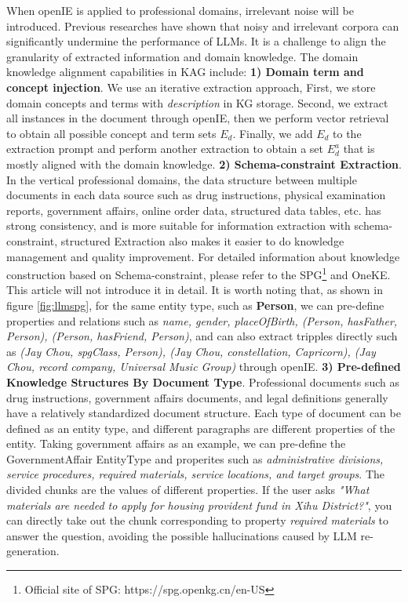 \documentclass{article}
\begin{document}
When openIE is applied to professional domains, irrelevant noise will be introduced. Previous researches\cite{chen2024benchmarking,yu2023chain,wu2024easily} have shown that noisy and irrelevant corpora can significantly undermine the performance of LLMs. It is a challenge to align the granularity of extracted information and domain knowledge. The domain knowledge alignment capabilities in KAG include: \textbf{1) Domain term and concept injection}. We use an iterative extraction approach, First, we store domain concepts and terms with \textit{description} in KG storage. Second, we extract all instances in the document through openIE, then we perform vector retrieval to obtain all possible concept and term sets $E_d$. Finally, we add $E_d$ to the extraction prompt and perform another extraction to obtain a set $E_{d}^{a}$ that is mostly aligned with the domain knowledge. \textbf{2) Schema-constraint Extraction}. In the vertical professional domains, the data structure between multiple documents in each data source such as drug instructions, physical examination reports, government affairs, online order data, structured data tables, etc. has strong consistency, and is more suitable for information extraction with schema-constraint, structured Extraction also makes it easier to do knowledge management and quality improvement. For detailed information about knowledge construction based on Schema-constraint, please refer to the SPG\footnote{Official site of SPG: https://spg.openkg.cn/en-US} and OneKE\cite{gui2024iepile}. This article will not introduce it in detail. It is worth noting that, as shown in figure \ref{fig:llmspg}, for the same entity type, such as \textbf{Person}, we can pre-define properties and relations such as \textit{{name, gender, placeOfBirth, (Person, hasFather, Person), (Person, hasFriend, Person)}}, and can also extract tripples directly such as \textit{(Jay Chou, spgClass, Person), (Jay Chou, constellation, Capricorn), (Jay Chou, record company, Universal Music Group)} through openIE. \textbf{3) Pre-defined Knowledge Structures By Document Type}. Professional documents such as drug instructions, government affairs documents, and legal definitions generally have a relatively standardized document structure. Each type of document can be defined as an entity type, and different paragraphs are different properties of the entity. Taking government affairs as an example, we can pre-define the GovernmentAffair EntityType and properites such as \textit{administrative divisions, service procedures, required materials, service locations, and target groups}. The divided chunks are the values of different properties. If the user asks \textit{"What materials are needed to apply for housing provident fund in Xihu District?"}, you can directly take out the chunk corresponding to property \textit{required materials} to answer the question, avoiding the possible hallucinations caused by LLM re-generation.
\end{document}
